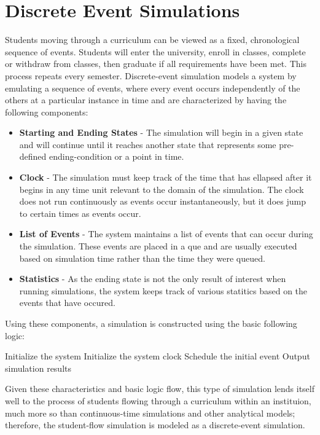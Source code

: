 \documentclass[botnum, fleqn]{unmeethesis}
\begin{document}
\section{Discrete Event Simulations}
Students moving through a curriculum can be viewed as a fixed, chronological sequence of events. Students will enter the university, enroll in classes, complete or withdraw from classes, then graduate if all requirements have been met. This process repeats every semester. Discrete-event simulation models a system by emulating a sequence of events, where every event occurs independently of the others at a particular instance in time and are characterized by having the following components:

\begin{itemize}
\item \textbf{Starting and Ending States} - The simulation will begin in a given state and will continue until it reaches another state that represents some pre-defined ending-condition or a point in time.
\item \textbf{Clock} - The simulation must keep track of the time that has ellapsed after it begins in any time unit relevant to the domain of the simulation. The clock does not run continuously as events occur instantaneously, but it does jump to certain times as events occur.
\item \textbf{List of Events} - The system maintains a list of events that can occur during the simulation. These events are placed in a que and are usually executed based on simulation time rather than the time they were queued.
\item \textbf{Statistics} - As the ending state is not the only result of interest when running simulations, the system keeps track of various statitics based on the events that have occured.
\end{itemize}

Using these components, a simulation is constructed using the basic following logic:

\begin{algorithmic}[1]
\STATE Initialize the system
\STATE Initialize the system clock
\STATE Schedule the initial event
\ENDWHILE
\STATE Output simulation results
\end{algorithmic}

Given these characteristics and basic logic flow, this type of simulation lends itself well to the process of students flowing through a curriculum within an instituion, much more so than continuous-time simulations and other analytical models; therefore, the student-flow simulation is modeled as a discrete-event simulation.
\end{document}
